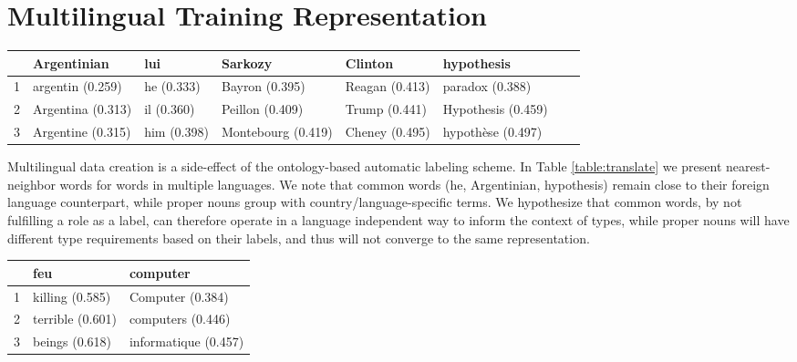 \documentclass[letterpaper]{article}
\begin{document}
\section{Multilingual Training Representation}
\label{section:translation}

\begin{table*}[t]
\caption{Top- Nearest neighbors (cosine distance) in shared English-French word vector space.}
\begin{center}
\begin{tabular}{|r|l|l|l|l|l|l|l|}
\hline
 & Argentinian & lui & Sarkozy & Clinton & hypothesis\\
\hline
1   & argentin (0.259)   & he (0.333) & Bayron (0.395) & Reagan (0.413) & paradox (0.388)\\
2    & Argentina (0.313)   & il (0.360) & Peillon (0.409) & Trump (0.441) & Hypothesis (0.459) \\
3    & Argentine (0.315)   & him (0.398) & Montebourg (0.419) & Cheney (0.495) & hypoth\`ese (0.497) \\
\hline
\end{tabular}
\end{center}
\label{table:translate}
\end{table*}

Multilingual data creation is a side-effect of the ontology-based automatic labeling scheme. In Table \ref{table:translate} we present nearest-neighbor words for words in multiple languages. We note that common words (he, Argentinian, hypothesis) remain close to their foreign language counterpart, while proper nouns group with country/language-specific terms.
We hypothesize that common words, by not fulfilling a role as a label, can therefore operate in a language independent way to inform the context of types, while proper nouns will have different type requirements based on their labels, and thus will not converge to the same representation.

\begin{table*}[ht]
\caption{Additional set of Top- Nearest neighbors (cosine distance) in shared English-French word vector space.}
\begin{center}
\begin{tabular}{|r|l|l|}
\hline
 & feu             & computer\\
\hline
1    & killing (0.585) & Computer (0.384)\\
2    & terrible (0.601) & computers (0.446) \\
3    & beings (0.618) & informatique (0.457) \\
\hline
\end{tabular}
\end{center}
\label{table:translate-more}
\end{table*}
\end{document}
